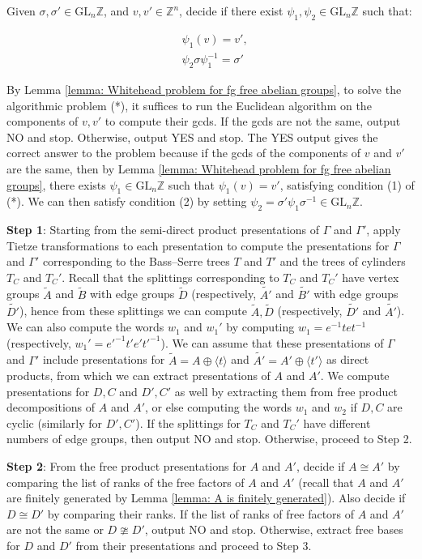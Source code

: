 \documentclass{amsart}
\newcommand{\Z}{\mathbb{Z}}
\theoremstyle{plain}
\theoremstyle{definition}
\theoremstyle{remark}
\begin{document}
Given $\sigma, \sigma' \in \mathrm{GL}_n \Z$, and $v,v' \in \Z^n$, decide if there exist $\psi_1, \psi_2 \in \mathrm{GL}_n \Z$ such that: 

\begin{align}
    &\psi_1(v) = v', \\
    &\psi_2 \sigma \psi_1^{-1} = \sigma'
\end{align}


By Lemma \ref{lemma: Whitehead problem for fg free abelian groups}, to solve the algorithmic problem (*), it suffices to run the Euclidean algorithm on the components of $v,v'$ to compute their gcds. If the gcds are not the same, output NO and stop. Otherwise, output YES and stop. The YES output gives the correct answer to the problem because if the gcds of the components of $v$ and $v'$ are the same, then by Lemma \ref{lemma: Whitehead problem for fg free abelian groups}, there exists $\psi_1 \in \mathrm{GL}_n \Z$ such that $\psi_1(v) = v'$, satisfying condition (1) of (*). We can then satisfy condition (2) by setting $\psi_2 = \sigma' \psi_1 \sigma^{-1} \in \mathrm{GL}_n \Z$. 


\textbf{Step 1}: Starting from the semi-direct product presentations of $\Gamma$ and $\Gamma'$, apply Tietze transformations to each presentation to compute the presentations for $\Gamma$ and $\Gamma'$ corresponding to the Bass--Serre trees $T$ and $T'$ and the trees of cylinders $T_C$ and $T_C'$. Recall that the splittings corresponding to $T_C$ and $T_C'$ have vertex groups $\tilde{A}$ and $\tilde{B}$ with edge groups $\tilde{D}$ (respectively, $\tilde{A'}$ and $\tilde{B'}$ with edge groups $\tilde{D'}$), hence from these splittings we can compute $\tilde{A}, \tilde{D}$ (respectively, $\tilde{D'}$ and $\tilde{A'}$). We can also compute the words $w_1$ and $w_1'$ by computing $w_1 = e^{-1}tet^{-1}$ (respectively, $w_1' = e'^{-1}t'e't'^{-1}$). We can assume that these presentations of $\Gamma$ and $\Gamma'$ include presentations for $\tilde{A} = A \oplus \langle t \rangle$ and $\tilde{A'} = A' \oplus \langle t' \rangle$ as direct products, from which we can extract presentations of $A$ and $A'$. We compute presentations for $D,C$ and $D',C'$ as well by extracting them from free product decompositions of $A$ and $A'$, or else computing the words $w_1$ and $w_2$ if $D,C$ are cyclic (similarly for $D',C'$). If the splittings for $T_C$ and $T_C'$ have different numbers of edge groups, then output NO and stop. Otherwise, proceed to Step 2. 


\textbf{Step 2}: From the free product presentations for $A$ and $A'$, decide if $A \cong A'$ by comparing the list of ranks of the free factors of $A$ and $A'$ (recall that $A$ and $A'$ are finitely generated by Lemma \ref{lemma: A is finitely generated}). Also decide if $D \cong D'$ by comparing their ranks. If the list of ranks of free factors of $A$ and $A'$ are not the same or $D \ncong D'$, output NO and stop. Otherwise, extract free bases for $D$ and $D'$ from their presentations and proceed to Step 3.
\end{document}
